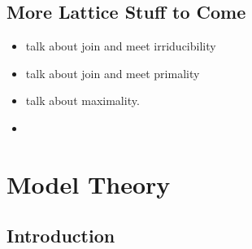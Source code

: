 \documentclass{book}
\begin{document}
	
	
	
	
	
	
	
	
	
	
	
	
	
	
	
	\newpage
	\section{More Lattice Stuff to Come}
	\begin{itemize}
		\item talk about join and meet irriducibility
		\item talk about join and meet primality
		\item talk about maximality.
		\item {}
	\end{itemize}
	
	
	
	
	
	
	
	
	
	
	
	
	
	
	
	
	
	
	
	
	
	
	
	
	
	
	
	
	
	
	
	
	
	
	
	
	
	
	
	
	\newpage
	\chapter{Model Theory}
	
	\section{Introduction}
	
	
	
	
	
	
	
	
	
	
	
\end{document}
